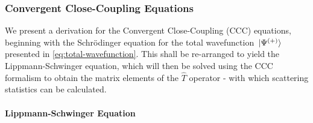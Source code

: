 \documentclass[draft]{article}
\begin{document}
\subsubsection{Convergent Close-Coupling Equations}
\label{sec:ccc-equations}

We present a derivation for the Convergent Close-Coupling (CCC) equations,
beginning with the Schr\"odinger equation for the total wavefunction
$\ket*{\Psi^{(+)}}$ presented in \autoref{eq:total-wavefunction}.
This shall be re-arranged to yield the Lippmann-Schwinger equation, which will
then be solved using the CCC formalism to obtain the matrix elements of the
$\hat{T}$ operator - with which scattering statistics can be calculated.

\paragraph{Lippmann-Schwinger Equation}
\label{sec:lippmann-schwinger}
\end{document}
